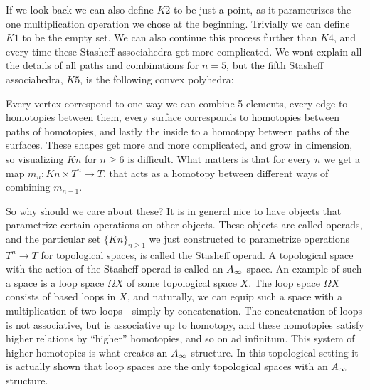  
If we look back we can also define $K2$ to be just a point, as it parametrizes the one multiplication operation we chose at the beginning. Trivially we can define $ K1$ to be the empty set. We can also continue this process further than $K4$, and every time these Stasheff associahedra get more complicated. We wont explain all the details of all paths and combinations for $n=5$, but the fifth Stasheff associahedra, $K5$, is the following convex polyhedra:

\begin{center}
\def\svgwidth{0.5\textwidth}

\end{center}

Every vertex correspond to one way we can combine 5 elements, every edge to homotopies between them, every surface corresponds to homotopies between paths of homotopies, and lastly the inside to a homotopy between paths of the surfaces. These shapes get more and more complicated, and grow in dimension, so visualizing $Kn$ for $n\geq 6$ is difficult. What matters is that for every $n$ we get a map $m_n:Kn\times T^n\longrightarrow T$, that acts as a homotopy between different ways of combining $m_{n-1}$.

 

\begin{remark}
So why should we care about these? It is in general nice to have objects that parametrize certain operations on other objects. These objects are called operads, and the particular set $\{Kn\}_{n\geq 1}$ we just constructed to parametrize operations $T^n\longrightarrow T$ for topological spaces, is called the Stasheff operad. A topological space with the action of the Stasheff operad is called an $A_{\infty}$-space. An example of such a space is a loop space $\Omega X$ of some topological space $X$. The loop space $\Omega X$ consists of based loops in $X$, and naturally, we can equip such a space with a multiplication of two loops---simply by concatenation. The concatenation of loops is not associative, but is associative up to homotopy, and these homotopies satisfy higher relations by ``higher'' homotopies, and so on ad infinitum. This system of higher homotopies is what creates an $A_{\infty}$ structure. In this topological setting it is actually shown that loop spaces are the only topological spaces with an $A_{\infty}$ structure. 
\end{remark}

